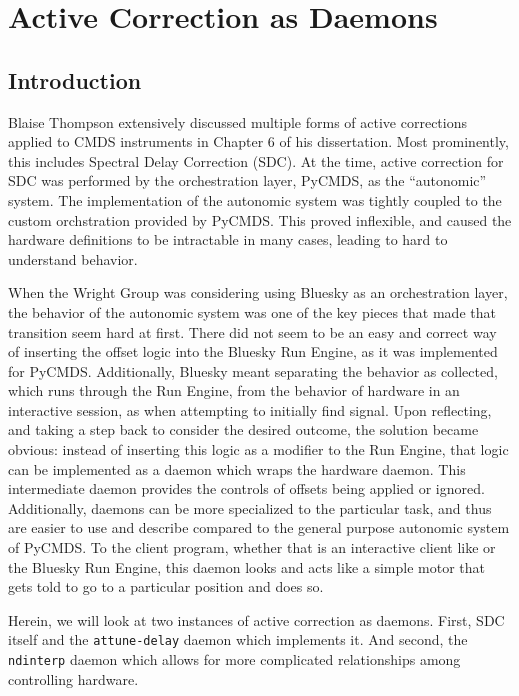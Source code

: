\chapter{Active Correction as Daemons} \label{cha:act_corr}

\clearpage

\section{Introduction}  %

Blaise Thompson extensively discussed multiple forms of active corrections applied to CMDS instruments in Chapter 6 of his dissertation\cite{ThompsonBlaiseJonathan2018a}.
Most prominently, this includes Spectral Delay Correction (SDC).
At the time, active correction for SDC was performed by the orchestration layer, PyCMDS, as the ``autonomic'' system.
The implementation of the autonomic system was tightly coupled to the custom orchstration provided by PyCMDS.
This proved inflexible, and caused the hardware definitions to be intractable in many cases, leading to hard to understand behavior.

When the Wright Group was considering using Bluesky as an orchestration layer, the behavior of the autonomic system was one of the key pieces that made that transition seem hard at first.
There did not seem to be an easy and correct way of inserting the offset logic into the Bluesky Run Engine, as it was implemented for PyCMDS.
Additionally, Bluesky meant separating the behavior as collected, which runs through the Run Engine, from the behavior of hardware in an interactive session, as when attempting to initially find signal.
Upon reflecting, and taking a step back to consider the desired outcome, the solution became obvious: instead of inserting this logic as a modifier to the Run Engine, that logic can be implemented as a daemon which wraps the hardware daemon.
This intermediate daemon provides the controls of offsets being applied or ignored.
Additionally, daemons can be more specialized to the particular task, and thus are easier to use and describe compared to the general purpose autonomic system of PyCMDS.
To the client program, whether that is an interactive client like \yaqcqtpy{} or the Bluesky Run Engine, this daemon looks and acts like a simple motor that gets told to go to a particular position and does so.

Herein, we will look at two instances of active correction as daemons.
First, SDC itself and the \texttt{attune-delay} daemon which implements it.
And second, the \texttt{ndinterp} daemon which allows for more complicated relationships among controlling hardware.

